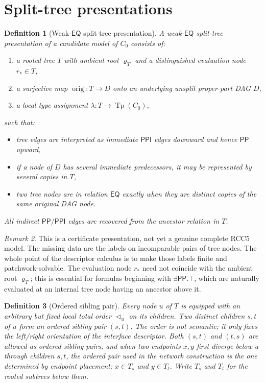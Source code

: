 \documentclass[11pt]{article}
\newtheorem{definition}{Definition}[section]
\theoremstyle{remark}
\newtheorem{remark}[definition]{Remark}
\newcommand{\PP}{\mathsf{PP}}
\newcommand{\PPI}{\mathsf{PPI}}
\newcommand{\EQ}{\mathsf{EQ}}
\newcommand{\Tp}{\operatorname{Tp}}
\newcommand{\orig}{\operatorname{orig}}
\begin{document}
\section{Split-tree presentations}

\begin{definition}[Weak-$\EQ$ split-tree presentation]
A \emph{weak-$\EQ$ split-tree presentation} of a candidate model of $C_0$ consists of:
\begin{enumerate}[label=(\roman*)]
    \item a rooted tree $T$ with ambient root $\varrho_T$ and a distinguished \emph{evaluation node} $r_\ast\in T$,
    \item a surjective map $\orig:T\to D$ onto an underlying unsplit proper-part DAG $D$,
    \item a local type assignment $\lambda:T\to\Tp(C_0)$,
\end{enumerate}
such that:
\begin{itemize}
    \item tree edges are interpreted as immediate $\PPI$ edges downward and hence $\PP$ upward,
    \item if a node of $D$ has several immediate predecessors, it may be represented by several copies in $T$,
    \item two tree nodes are in relation $\EQ$ exactly when they are distinct copies of the same original DAG node.
\end{itemize}
All indirect $\PP/\PPI$ edges are recovered from the ancestor relation in $T$.
\end{definition}

\begin{remark}
This is a certificate presentation, not yet a genuine complete RCC5 model. The missing data are the labels on incomparable pairs of tree nodes. The whole point of the descriptor calculus is to make those labels finite and patchwork-solvable. The evaluation node $r_\ast$ need not coincide with the ambient root $\varrho_T$; this is essential for formulas beginning with $\exists\PP.\top$, which are naturally evaluated at an internal tree node having an ancestor above it.
\end{remark}

\begin{definition}[Ordered sibling pair]\label{def:ordered-siblings}
Every node $u$ of $T$ is equipped with an arbitrary but fixed local total order $\triangleleft_u$ on its children. Two distinct children $s,t$ of $u$ form an \emph{ordered sibling pair} $(s,t)$. The order is not semantic; it only fixes the left/right orientation of the interface descriptor. Both $(s,t)$ and $(t,s)$ are allowed as ordered sibling pairs, and when two endpoints $x,y$ first diverge below $u$ through children $s,t$, the ordered pair used in the network construction is the one determined by endpoint placement: $x\in T_s$ and $y\in T_t$. Write $T_s$ and $T_t$ for the rooted subtrees below them.
\end{definition}
\end{document}
